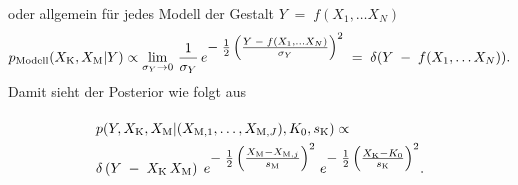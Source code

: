 \begin{enumerate}
oder allgemein für jedes Modell der Gestalt $Y \; = \; f(X_1, \dots X_N)$
\begin{equation}
p_\mathrm{Modell} (X_\mathrm{K}, X_\mathrm{M} | Y) \propto
\lim\limits_{\sigma_Y \rightarrow 0}  \, \frac{1}{\sigma_Y} \,
e^{\textstyle-\;\frac{1}{2} \left(\frac{ Y \; - \; f(X_1, \dots X_N)}{\sigma_Y} \right)^2} \; = \;
\delta(Y \; - \; f(X_1, \dots X_N) ) .
\label{pdfallgemeinesModellDiracPeak}
\end{equation}
	Damit sieht der Posterior wie folgt aus
\begin{equation}
\arraycolsep=2.0pt\def\arraystretch{2.0}
\begin{array}{l}
p(Y, X_\mathrm{K}, X_\mathrm{M} | (X_{\mathrm{M},1}, \dots, X_{\mathrm{M},J}), K_0, s_\mathrm{K}) \propto \\
\delta \left( Y \; - \; X_\mathrm{K} \, X_\mathrm{M}\right)
\; e^{\T-\;\frac{1}{2} \left(\frac{ X_\mathrm{M} - X_{\mathrm{M},j} }{s_\mathrm{M}} \right)^2}
\;  e^{\T-\;\frac{1}{2} \left(\frac{X_\mathrm{K} - K_0}{s_\mathrm{K}} \right)^2}.
\end{array}
\label{eq:PosteriorFall4}
\end{equation}
\end{enumerate}

